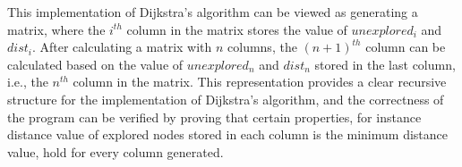 This implementation of Dijkstra's algorithm can be viewed as generating a matrix, where the $i^{th}$ column in the matrix stores the value of $unexplored_i$ and $dist_i$. After calculating a matrix with $n$ columns, the $(n+1)^{th}$ column can be calculated based on the value of $unexplored_n$ and $dist_n$ stored in the last column, i.e., the $n^{th}$ column in the matrix. This representation provides a clear recursive structure for the implementation of Dijkstra's algorithm, and the correctness of the program can be verified by proving that certain properties, for instance distance value of explored nodes stored in each column is the minimum distance value, hold for every column generated. 
